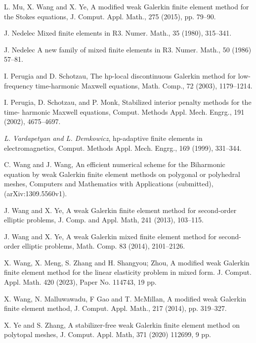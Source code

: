 \documentclass[11pt]{amsart}
\begin{document}
\begin{thebibliography}{99}
 L. Mu, X. Wang and X. Ye, 
A modified weak Galerkin finite element method for the Stokes equations, J. Comput. Appl. Math., 275 (2015), pp. 79--90. 

{  J.  Nedelec} {   Mixed finite elements in R3}. Numer. Math.,
35 (1980), 315--341.

{  J.  Nedelec} {   A new family of mixed finite elements in
R3}. Numer. Math., 50 (1986) 57--81.

{  I. Perugia and D. Schotzau}, {  The hp-local discontinuous
Galerkin method for low-frequency time-harmonic Maxwell equations},
Math. Comp., 72 (2003), 1179--1214.

{  I. Perugia, D. Schotzau, and P. Monk}, {  Stabilized interior
penalty methods for the time- harmonic Maxwell equations}, Comput.
Methods Appl. Mech. Engrg., 191 (2002), 4675--4697.

{\sl L. Vardapetyan and L. Demkowicz},
{  hp-adaptive ﬁnite elements in electromagnetics},
Comput. Methods Appl. Mech. Engrg., 169 (1999), 331--344.


{  C. Wang and J. Wang}, {  An efficient numerical scheme for
the Biharmonic equation by weak Galerkin finite element methods on
polygonal or polyhedral meshes}, Computers and Mathematics with
Applications (submitted), (arXiv:1309.5560v1).



{  J. Wang and X. Ye}, {  A weak Galerkin finite element method
for second-order elliptic problems},  J. Comp. and Appl. Math, 241
(2013), 103--115.

{  J. Wang and X. Ye}, {  A weak Galerkin mixed finite element
method for second-order elliptic problems}, Math. Comp.  83 (2014), 2101--2126.

 X. Wang, X. Meng, S. Zhang and H. Shangyou; Zhou, 
  A modified weak Galerkin finite element method for the linear elasticity problem in mixed form. J. Comput. Appl. Math. 420 (2023), Paper No. 114743, 19 pp.

 X. Wang, N. Malluwawadu, F Gao and T. McMillan, A modified weak Galerkin finite element method, J. Comput. Appl. Math., 217 (2014), pp. 319--327. 


X. Ye and S. Zhang, A stabilizer-free weak Galerkin finite element method on polytopal meshes,
 J. Comput. Appl. Math, 371 (2020) 112699, 9 pp.




\end{thebibliography}
\end{document}
